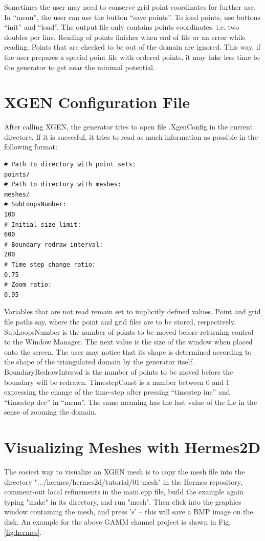 \documentclass[12pt]{article}
\begin{document}
  Sometimes the user may need to conserve grid point coordinates for
  further use. In ``menu'', the user can use the button ``save points''.
  To load points, use buttons ``init'' and ``load''.
  \indent
  The output file only contains points coordinates, i.e. two
  doubles per line. Reading of points finishes when end of file
  or an error while reading. Points that are checked to be
  out of the domain are ignored. This way, if the user prepares a 
  special point file with ordered points, it may take less
  time to the generator to get near the minimal potential.  

  \section{XGEN Configuration File}
   
  After calling XGEN, the generator tries to open file
  .XgenConfig in the current directory. If it is succesful,
  it tries to read as much information as possible in the
  following format:

  \begin{verbatim} 
# Path to directory with point sets:
points/
# Path to directory with meshes:
meshes/
# SubLoopsNumber:
100
# Initial size limit:
600
# Boundary redraw interval:
200
# Time step change ratio:
0.75
# Zoom ratio:
0.95
  \end{verbatim}
  Variables that are not read remain set to implicitly defined
  values. Point and grid file paths say, where the point and grid 
  files are to be stored, respectively. SubLoopsNumber is the number of
  points to be moved before returning control to the Window Manager.
  The next value is the size of the window when placed onto the screen.
  The user may notice that its shape is determined according to the shape
  of the triangulated domain by the generator itself. BoundaryRedrawInterval
  is the number of points to be moved before the boundary will be
  redrawn. TimestepConst is a number between 0 and 1 expressing the change of
  the time-step after pressing ``timestep inc'' and ``timestep dec'' in ``menu''.
  The same meaning has the last value of the file in the sense of
  zooming the domain.

  \section{Visualizing Meshes with Hermes2D}

  The easiest way to visualize an XGEN mesh is to copy the mesh file into 
  the directory ".../hermes/hermes2d/tutorial/01-mesh" in the Hermes repository, 
  comment-out local refinements
  in the main.cpp file, build the example again typing "make" in its directory, and 
  run "mesh". Then click into the graphics window containing the mesh, and press 's'
  -- this will save a BMP image on the disk. An example for the above GAMM channel
  project is shown in Fig. \ref{fig:hermes}.
\end{document}
